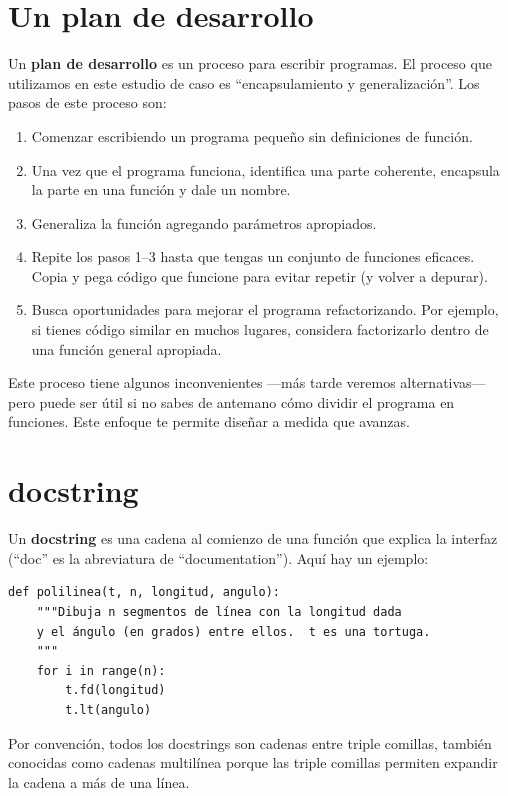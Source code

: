 \documentclass[10pt]{book}
\begin{document}
\section{Un plan de desarrollo}

Un {\bf plan de desarrollo} es un proceso para escribir programas.  El
proceso que utilizamos en este estudio de caso es ``encapsulamiento y
generalización''.  Los pasos de este proceso son:

\begin{enumerate}

\item Comenzar escribiendo un programa pequeño sin definiciones de función.

\item Una vez que el programa funciona, identifica una parte
  coherente, encapsula la parte en una función y dale un nombre.

\item Generaliza la función agregando parámetros apropiados.

\item Repite los pasos 1--3 hasta que tengas un conjunto de funciones eficaces.
Copia y pega código que funcione para evitar repetir (y volver a depurar).

\item Busca oportunidades para mejorar el programa refactorizando.
Por ejemplo, si tienes código similar en muchos lugares, considera
factorizarlo dentro de una función general apropiada.

\end{enumerate}

Este proceso tiene algunos inconvenientes ---más tarde veremos alternativas--- pero
puede ser útil si no sabes de antemano cómo dividir el
programa en funciones.  Este enfoque te permite diseñar a medida que
avanzas.


\section{docstring}
\label{docstring}

Un {\bf docstring} es una cadena al comienzo de una función que
explica la interfaz (``doc'' es la abreviatura de ``documentation'').  Aquí
hay un ejemplo:

\begin{verbatim}
def polilinea(t, n, longitud, angulo):
    """Dibuja n segmentos de línea con la longitud dada
    y el ángulo (en grados) entre ellos.  t es una tortuga.
    """
    for i in range(n):
        t.fd(longitud)
        t.lt(angulo)
\end{verbatim}
%
Por convención, todos los docstrings son cadenas entre triple comillas, también conocidas
como cadenas multilínea porque las triple comillas permiten expandir
la cadena a más de una línea.
\end{document}
